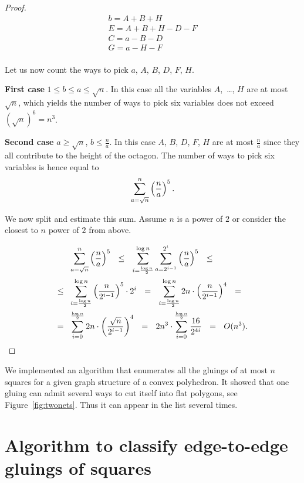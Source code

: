 \documentclass[a4paper,11pt]{article}
\begin{document}
\begin{proof}
\[ \begin{array}{l}
	b = A+B+H \\
	E = A+B+H-D-F \\
	C = a-B-D \\
	G = a-H-F \\
\end{array} \]

Let us now count the ways to pick $a$, $A$, $B$, $D$, $F$, $H$.

{\bfseries First case} \( 1 \le b \le a \le \sqrt{n} \). In this case all the variables $A$,~\ldots, $H$ are at most $\sqrt{n}$, which yields the number of ways to pick six variables does not exceed $(\sqrt{n})^6 = n^3$.

{\bfseries Second case} \(a \ge \sqrt{n}\), \(b \le \frac{n}{a}\). In this case $A$, $B$, $D$, $F$, $H$ are at most $\frac{n}{a}$ since they all contribute to the height of the octagon. The number of ways to pick six variables is hence equal to
	\[ \sum\limits_{a=\sqrt{n}}^n \left( \frac{n}{a} \right)^5.\]

We now split and estimate this sum. Assume $n$ is a power of $2$ or consider the closest to $n$ power of $2$ from above.\vspace{-0.7cm}

\begin{align*}
	& \slim_{a=\sqrt{n}}^n \ll \frac{n}{a} \rr^5\ \ \le\ \ \sloglim
		\slim_{a=2^{i-1}}^{2^i} \ll \frac{n}{a} \rr^5\ \ \le \\
 	\le\ \ & \sloglim \ll \frac{n}{2^{i-1}} \rr^5 \cdot 2^i\ \ =\ \ \sloglim
 		2n \cdot \ll \frac{n}{2^{i-1}} \rr^4\ \ = \\
	=\ \ & \slim_{i=0}^{\frac{\log n}{2}} 2n \cdot \ll \frac{\sqrt{n}}{2^{i-1}} \rr^4
		\ \ =\ \ 2n^3 \cdot \slim_{i=0}^{\frac{\log n}{2}} \frac{16}{2^{4i}}\ \ =\ \ O(n^3).
\end{align*} \end{proof}

We implemented an algorithm that enumerates all the gluings of at most $n$ squares for a given graph structure of a convex polyhedron. It showed that one gluing can admit several ways to cut itself into flat polygons, see Figure~\ref{fig:twonets}. Thus it can appear in the list several times.



\section{Algorithm to classify edge-to-edge gluings of squares}
\end{document}
